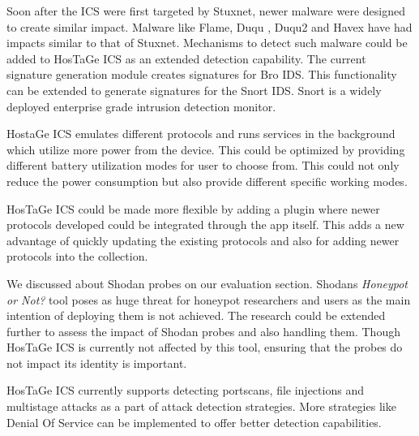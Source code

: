 \documentclass[article,msc=informatik,type=msc,colorback,accentcolor=tud9c]{tudthesis}
\begin{document}
  	\vspace{3mm}
  	Soon after the \ac{ICS} were first targeted by Stuxnet, newer malware were designed to create similar impact. Malware like Flame, Duqu , Duqu2 and Havex have had impacts similar to that of Stuxnet. Mechanisms to detect such malware could be added to HosTaGe ICS as an extended detection capability. 
  	The current signature generation module creates signatures for Bro IDS. This functionality can be extended to generate signatures for the Snort IDS\cite{roesch1999snort}. Snort is a widely deployed enterprise grade intrusion detection monitor. 
  	
  	
  	\vspace{3mm}
  	HostaGe ICS emulates different protocols and runs services in the background which utilize more power from the device. This could be optimized by providing different battery utilization modes for user to choose from. This could not only reduce the power consumption but also provide different specific working modes.
  
  
  	\vspace{3mm}
  	HosTaGe ICS could be made more flexible by adding a plugin where newer protocols developed could be integrated through the app itself. This adds a new advantage of quickly updating the existing protocols and also for adding newer protocols into the collection. 
  
  
  	\vspace{3mm}
  	We discussed about Shodan probes on our evaluation section. Shodans \textit{Honeypot or Not?} tool poses as huge threat for honeypot researchers and users as the main intention of deploying them is not achieved. The research could be extended further to assess the impact of Shodan probes and also handling them. Though HosTaGe ICS is currently not affected by this tool, ensuring that the probes do not impact its identity is important. 
  	
  	
  	 \vspace{3mm}
  	HosTaGe ICS currently supports detecting portscans, file injections and multistage attacks as a part of attack detection strategies. More strategies like Denial Of Service can be implemented to offer better detection capabilities.
  	
\end{document}
